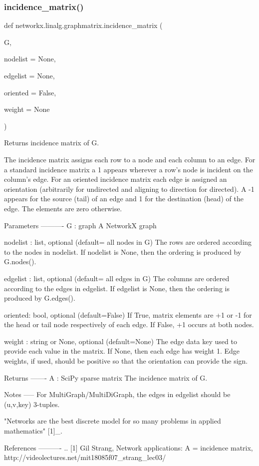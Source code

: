 \subsubsection{\texorpdfstring{incidence\+\_\+matrix()}{incidence\_matrix()}}
{\footnotesize\ttfamily def networkx.\+linalg.\+graphmatrix.\+incidence\+\_\+matrix (\begin{DoxyParamCaption}\item[{}]{G,  }\item[{}]{nodelist = {\ttfamily None},  }\item[{}]{edgelist = {\ttfamily None},  }\item[{}]{oriented = {\ttfamily False},  }\item[{}]{weight = {\ttfamily None} }\end{DoxyParamCaption})}

\begin{DoxyVerb}Returns incidence matrix of G.

The incidence matrix assigns each row to a node and each column to an edge.
For a standard incidence matrix a 1 appears wherever a row's node is
incident on the column's edge.  For an oriented incidence matrix each
edge is assigned an orientation (arbitrarily for undirected and aligning to
direction for directed).  A -1 appears for the source (tail) of an edge and
1 for the destination (head) of the edge.  The elements are zero otherwise.

Parameters
----------
G : graph
   A NetworkX graph

nodelist : list, optional   (default= all nodes in G)
   The rows are ordered according to the nodes in nodelist.
   If nodelist is None, then the ordering is produced by G.nodes().

edgelist : list, optional (default= all edges in G)
   The columns are ordered according to the edges in edgelist.
   If edgelist is None, then the ordering is produced by G.edges().

oriented: bool, optional (default=False)
   If True, matrix elements are +1 or -1 for the head or tail node
   respectively of each edge.  If False, +1 occurs at both nodes.

weight : string or None, optional (default=None)
   The edge data key used to provide each value in the matrix.
   If None, then each edge has weight 1.  Edge weights, if used,
   should be positive so that the orientation can provide the sign.

Returns
-------
A : SciPy sparse matrix
  The incidence matrix of G.

Notes
-----
For MultiGraph/MultiDiGraph, the edges in edgelist should be
(u,v,key) 3-tuples.

"Networks are the best discrete model for so many problems in
applied mathematics" [1]_.

References
----------
.. [1] Gil Strang, Network applications: A = incidence matrix,
   http://videolectures.net/mit18085f07_strang_lec03/
\end{DoxyVerb}
 

